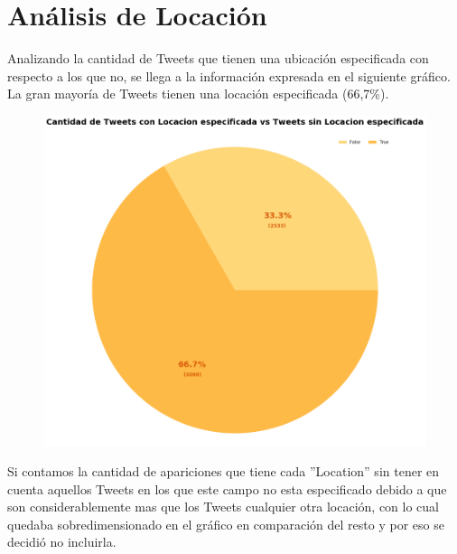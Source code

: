 \documentclass[titlepage,a4paper]{article}
\begin{document}
    \newpage
    \section{Análisis de Locación}\label{sec:intro}
    
    Analizando la cantidad de Tweets que tienen una ubicación especificada con respecto a los que no, se llega a la información expresada en el siguiente gráfico. La gran mayoría de Tweets tienen una locación especificada (66,7\%).
    
    \begin{figure}[H]
    \centering
    \includegraphics[width=1.1\textwidth]{graficos/Analisis de Locacion/cantidad_de_tweets_con_locacion_especificada_vs_sin_locacion_especificada.png}
    \caption{} 
    \end{figure}
    
    Si contamos la cantidad de apariciones que tiene cada ''Location'' sin tener en cuenta aquellos Tweets en los que este campo no esta especificado debido a que son considerablemente mas que los Tweets cualquier otra locación, con lo cual quedaba sobredimensionado en el gráfico en comparación del resto y por eso se decidió no incluirla.
    
\end{document}
